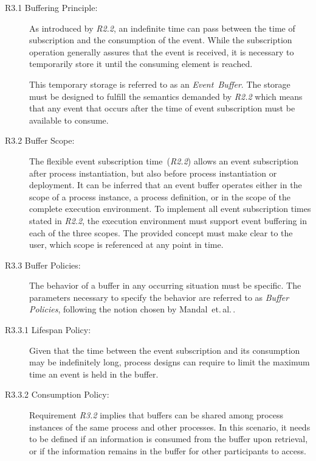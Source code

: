\begin{description}
	\item[R3.1 Buffering Principle:]
	As introduced by \textit{R2.2}, an indefinite time can pass between the time of subscription and the consumption of the event.
	While the subscription operation generally assures that the event is received, it is necessary to temporarily store it until the consuming element is reached.
	
	This temporary storage is referred to as an \textit{Event~Buffer}.
	The storage must be designed to fulfill the semantics demanded by \textit{R2.2} which means that any event that occurs after the time of event subscription must be available to consume.
	
	\item[R3.2 Buffer Scope:]
	The flexible event subscription time~(\textit{R2.2}) allows an event subscription after process instantiation, but also before process instantiation or deployment.
	It can be inferred that an event buffer operates either in the scope of a process instance, a process definition, or in the scope of the complete execution environment.
	To implement all event subscription times stated in \textit{R2.2}, the execution environment must support event buffering in each of the three scopes. 
	The provided concept must make clear to the user, which scope is referenced at any point in time.
	
	\item[R3.3 Buffer Policies:]
	The behavior of a buffer in any occurring situation must be specific.
	The parameters necessary to specify the behavior are referred to as \textit{Buffer Policies}, following the notion chosen by  Mandal~et.\,al.\,\cite{mandal:2017}.
	
	\item[R3.3.1 Lifespan Policy:]
	Given that the time between the event subscription and its consumption may be indefinitely long, process designs can require to limit the maximum time an event is held in the buffer.
	
	\item[R3.3.2 Consumption Policy:]
	Requirement \textit{R3.2} implies that buffers can be shared among process instances of the same process and other processes.
	In this scenario, it needs to be defined if an information is consumed from the buffer upon retrieval, or if the information remains in the buffer for other participants to access. 
		

\end{description}
